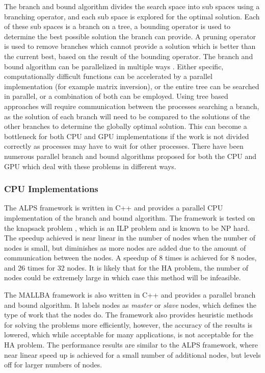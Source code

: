 \documentclass[10pt,twocolumn]{article}
\begin{document}
The branch and bound algorithm divides the search space into sub spaces using a branching operator, and each sub
space is explored for the optimal solution. Each of these sub spaces is a branch on a tree, a bounding 
operator is used to determine the best possible solution the branch can provide. A pruning operator is used 
to remove branches which cannot provide a solution which is better than the current best, based on the result
of the bounding operator.
The branch and bound algorithm can be parallelized in multiple ways \cite{crainic:2006}. Either specific,
computationally difficult functions can be accelerated by a parallel implementation (for example matrix
inversion), or the entire tree can be searched in parallel, or a combination of both can be employed. Using tree
based approaches will require communication between the processes searching a branch, as the solution of each
branch will need to be compared to the solutions of the other branches to determine the globally optimal
solution. This can become a bottleneck for both CPU and GPU implementations if the work is not divided
correctly as processes may have to wait for other processes. There have been numerous parallel branch and 
bound algorithms proposed for both the CPU and GPU which deal with these problems in different ways.

\subsubsection{CPU Implementations } \label{ssec:cpuimp}

The ALPS framework \cite{xu:2005} is written in C++ and provides a parallel CPU implementation of the branch
and bound algorithm. The framework is tested on the knapsack problem \cite{kedia:2005}, which is an ILP problem 
and is known to be NP hard. The speedup achieved is near linear in the number of nodes when the number of 
nodes is small, but diminishes as more nodes are added due to the amount of communication between the nodes. 
A speedup of 8 times is achieved for 8 nodes, and 26 times for 32 nodes. It is likely that for the HA problem, 
the number of nodes could be extremely large in which case this method will be infeasible. 

The MALLBA framework \cite{alba:2002} is also written in C++ and provides a parallel branch and bound
algorithm. It labels nodes as \textit{master} or \textit{slave} nodes, which defines the type of work that the
nodes do. The framework also provides heuristic methods for solving the problems more efficiently, however, the
accuracy of the results is lowered, which while acceptable for many applications, is not acceptable for the HA
problem. The performance results are similar to the ALPS framework, where near linear speed up is achieved for
a small number of additional nodes, but levels off for larger numbers of nodes.
\end{document}
